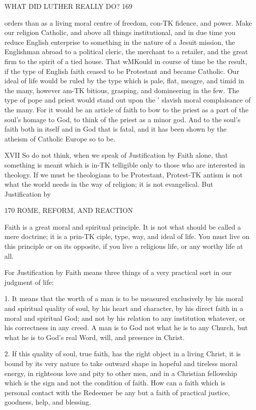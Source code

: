 \documentclass[12pt,a5paper,twoside]{book}
\begin{document}
{WHAT DID LUTHER REALLY DO? 169 

orders than as a living moral centre of freedom, con-TK
fidence, and power. Make our religion Catholic, and 
above all things institutional, and in due time you 
reduce English enterprise to something in the nature 
of a Jesuit mission, the Englishman abroad to a political 
cleric, the merchant to a retailer, and the great firm 
to the spirit of a tied house. That wMKould in course 
of time be the result, if the type of English faith 
ceased to be Protestant and became Catholic. Our 
ideal of life would be ruled by the type which is pale, 
flat, meagre, and timid in the many, however am-TK
bitious, grasping, and domineering in the few. The 
type of pope and priest would stand out upon the 
' slavish moral complaisance of the many. For it would 
be an article of faith to bow to the priest as a part of 
the soul's homage to God, to think of the priest as a 
minor god. And to the soul's faith both in itself and 
in God that is fatal, and it has been shown by the 
atheism of Catholic Europe so to be. 

XVII 
So do not think, when we speak of Justification by 
Faith alone, that something is meant which is in-TK
telligible only to those who are interested in theology. 
If we must be theologians to be Protestant, Protest-TK
antism is not what the world needs in the way of 
religion; it is not evangelical. But Justification by 



170 ROME, REFORM, AND REACTION 

Faith is a great moral and spiritual principle. It is not 
what should be called a mere doctrine; it is a prin-TK
ciple, type, way, and ideal of life. You must live on 
this principle or on its opposite, if you live a religious 
life, or any worthy life at all. 

For Justification by Faith means three things of a 
very practical sort in our judgment of life: 

1. It means that the worth of a man is to be 
measured exclusively by his moral and spiritual quality 
of soul, by his heart and character, by his direct faith 
in a moral and spiritual God; and not by his relation 
to any institution whatever, or his correctness in any 
creed. A man is to God not what he is to any Church, 
but what he is to God's real Word, will, and presence 
in Christ. 

2. If this quality of soul, true faith, has the right 
object in a living Christ, it is bound by its very nature 
to take outward shape in hopeful and tireless moral 
energy, in righteous love and pity to other men, and 
in a Christian fellowship which is the sign and not the 
condition of faith. How can a faith which is personal 
contact with the Redeemer be any but a faith of 
practical justice, goodness, help, and blessing. 

}
\end{document}
